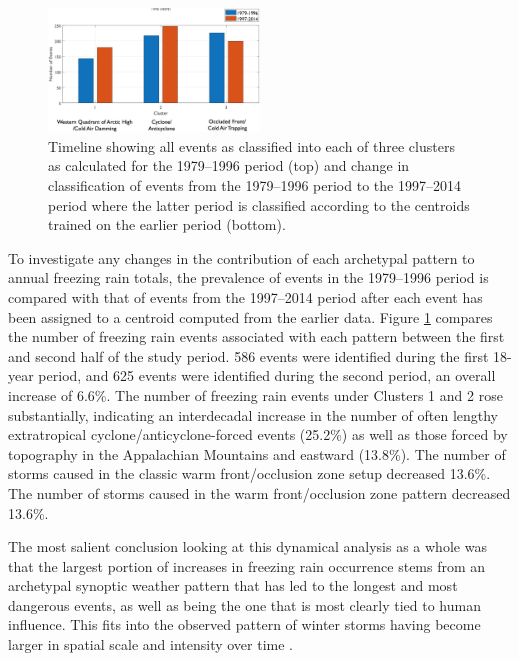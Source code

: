 \documentclass[twocol]{ametsoc}
\begin{document}
\begin{figure}
\centering
\includegraphics[width=0.5\textwidth]{Storm_Pattern_Change.png}
\caption{\label{fig:clusterchange} Timeline showing all events as classified into each of three clusters as calculated for the 1979--1996 period (top) and change in classification of events from the 1979--1996 period to the 1997--2014 period where the latter period is classified according to the centroids trained on the earlier period (bottom).}
\end{figure}

To investigate any changes in the contribution of each archetypal pattern to annual freezing rain totals, the prevalence of events in the 1979--1996 period is compared with that of events from the 1997--2014 period after each event has been assigned to a centroid computed from the earlier data. Figure \ref{fig:clusterchange} compares the number of freezing rain events associated with each pattern between the first and second half of the study period. 586 events were identified during the first 18-year period, and 625 events were identified during the second period, an overall increase of 6.6\%. The number of freezing rain events under Clusters 1 and 2  rose substantially, indicating an interdecadal increase in the number of often lengthy extratropical cyclone/anticyclone-forced events (25.2\%) as well as those forced by topography in the Appalachian Mountains and eastward (13.8\%). The number of storms caused in the classic warm front/occlusion zone setup decreased 13.6\%.  The number of storms caused in the warm front/occlusion zone pattern decreased 13.6\%. 

The most salient conclusion looking at this dynamical analysis as a whole was that the largest portion of increases in freezing rain occurrence stems from an archetypal synoptic weather pattern that has led to the longest and most dangerous events, as well as being the one that is most clearly tied to human influence. This fits into the observed pattern of winter storms having become larger in spatial scale and intensity over time \citep{changnon2007catastrophic}. 
\end{document}
